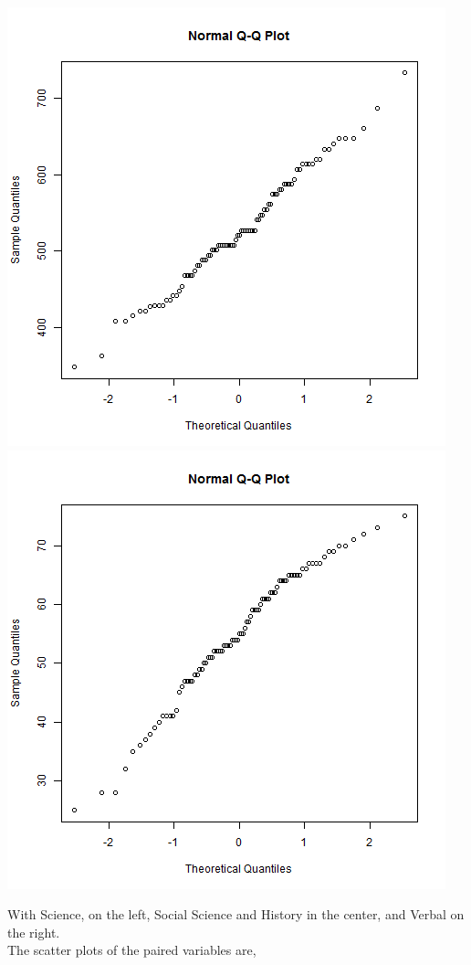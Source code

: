 \documentclass[letterpaper,10pt]{article}
\begin{document}
\begin{description}
\begin{enumerate}
\begin{center}
\includegraphics[scale=.33]{QQSoc.png}
\includegraphics[scale=.33]{QQVerb.png}
\end{center}
With Science, on the left, Social Science and History in the center, and Verbal on the right.\\
The scatter plots of the paired variables are,

\end{enumerate}
\end{description}
\end{document}
